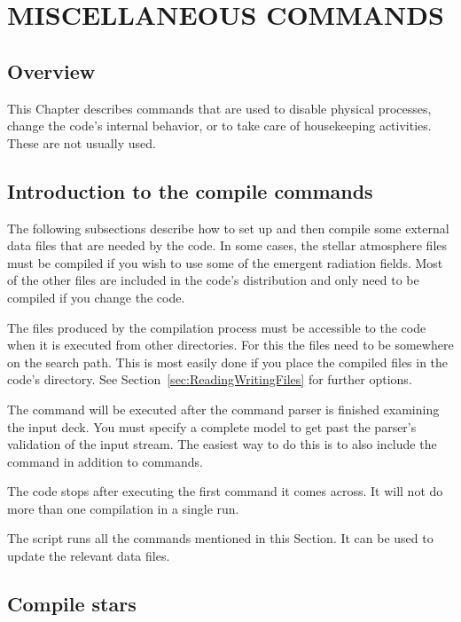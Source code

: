 \chapter{MISCELLANEOUS COMMANDS}
\label{sec:MiscellaneousCommands}

\section{Overview}

This Chapter describes commands that are used to disable physical
processes, change the code's internal behavior, or to take care of
housekeeping activities.
These are not usually used.

\section{Introduction to the compile commands}

The following subsections describe how to set up and then compile some
external data files that are needed by the code.
In some cases, the stellar atmosphere
files must be compiled if you wish to use some of the
 emergent radiation fields.
Most of the other files are included in the code's distribution and only
need to be compiled if you change the code.

The files produced by the compilation process must be accessible to the
code when it is executed from other directories.
For this the files need to be somewhere on the search path.
This is most easily done
if you place the compiled files in
the code's  directory.
See Section~\ref{sec:ReadingWritingFiles} for further options.

The  command will be executed after
the command parser is finished
examining the input deck.
You must specify a complete model to get past
the parser's validation of the input stream.
The easiest way to do this
is to also include the  command
in addition to
 commands.

The code stops after executing the first 
command it comes across.
It will not do more than one compilation in a single run.

The script  runs all the 
commands mentioned in this Section.
It can be used to update the relevant data files.

\section{Compile stars}

